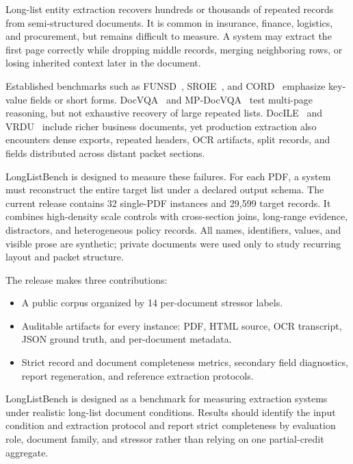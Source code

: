 Long-list entity extraction recovers hundreds or thousands of repeated records from semi-structured documents. It is common in insurance, finance, logistics, and procurement, but remains difficult to measure. A system may extract the first page correctly while dropping middle records, merging neighboring rows, or losing inherited context later in the document.

Established benchmarks such as FUNSD~\cite{jaume2019funsd}, SROIE~\cite{huang2021sroie}, and CORD~\cite{park2019cord} emphasize key-value fields or short forms. DocVQA~\cite{mathew2021docvqa} and MP-DocVQA~\cite{tito2022mpdocvqa} test multi-page reasoning, but not exhaustive recovery of large repeated lists. DocILE~\cite{simsa2023docile} and VRDU~\cite{wang2023vrdu} include richer business documents, yet production extraction also encounters dense exports, repeated headers, OCR artifacts, split records, and fields distributed across distant packet sections.

LongListBench is designed to measure these failures. For each PDF, a system must reconstruct the entire target list under a declared output schema. The current release contains 32 single-PDF instances and 29{,}599 target records. It combines high-density scale controls with cross-section joins, long-range evidence, distractors, and heterogeneous policy records. All names, identifiers, values, and visible prose are synthetic; private documents were used only to study recurring layout and packet structure.

The release makes three contributions:
\begin{itemize}
    \item A public corpus organized by 14 per-document stressor labels.
    \item Auditable artifacts for every instance: PDF, HTML source, OCR transcript, JSON ground truth, and per-document metadata.
    \item Strict record and document completeness metrics, secondary field diagnostics, report regeneration, and reference extraction protocols.
\end{itemize}

LongListBench is designed as a benchmark for measuring extraction systems under realistic long-list document conditions. Results should identify the input condition and extraction protocol and report strict completeness by evaluation role, document family, and stressor rather than relying on one partial-credit aggregate.
